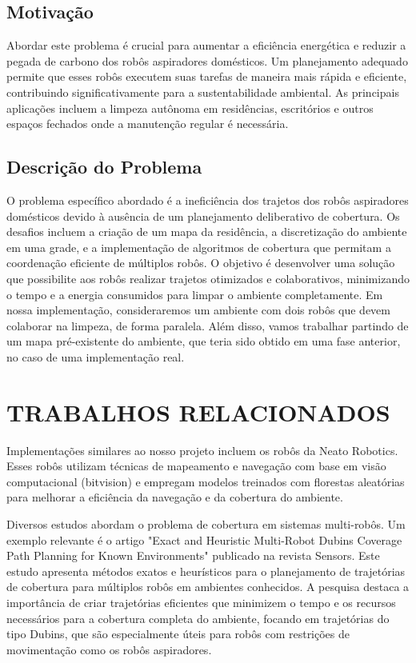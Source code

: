 \documentclass[a4paper, 10pt, conference]{ieeeconf}      %
\begin{document}
\subsection{Motivação}

Abordar este problema é crucial para aumentar a eficiência energética e reduzir a
pegada de carbono dos robôs aspiradores domésticos. Um planejamento adequado
permite que esses robôs executem suas tarefas de maneira mais rápida e eficiente,
contribuindo significativamente para a sustentabilidade ambiental. As principais
aplicações incluem a limpeza autônoma em residências, escritórios e outros
espaços fechados onde a manutenção regular é necessária.

\subsection{Descrição do Problema}

O problema específico abordado é a ineficiência dos trajetos dos robôs aspiradores
domésticos devido à ausência de um planejamento deliberativo de cobertura. Os
desafios incluem a criação de um mapa da residência, a discretização do ambiente
em uma grade, e a implementação de algoritmos de cobertura que permitam a
coordenação eficiente de múltiplos robôs. O objetivo é desenvolver uma solução
que possibilite aos robôs realizar trajetos otimizados e colaborativos, minimizando o
tempo e a energia consumidos para limpar o ambiente completamente.
Em nossa implementação, consideraremos um ambiente com dois robôs que devem
colaborar na limpeza, de forma paralela. Além disso, vamos trabalhar partindo de
um mapa pré-existente do ambiente, que teria sido obtido em uma fase anterior, no
caso de uma implementação real.

\section{TRABALHOS RELACIONADOS}

Implementações similares ao nosso projeto incluem os robôs da Neato Robotics.
Esses robôs utilizam técnicas de mapeamento e navegação com base em visão computacional
(bitvision) e empregam modelos treinados com florestas aleatórias para melhorar a eficiência da navegação
e da cobertura do ambiente.

Diversos estudos abordam o problema de cobertura em sistemas multi-robôs.
Um exemplo relevante é o artigo "Exact and Heuristic Multi-Robot Dubins Coverage Path Planning for Known Environments"
publicado na revista Sensors.
Este estudo apresenta métodos exatos e heurísticos para o planejamento de trajetórias de cobertura
para múltiplos robôs em ambientes conhecidos.
A pesquisa destaca a importância de criar trajetórias eficientes que minimizem o tempo e os
recursos necessários para a cobertura completa do ambiente, focando em trajetórias do tipo
Dubins, que são especialmente úteis para robôs com restrições de movimentação como os robôs aspiradores.
\end{document}
